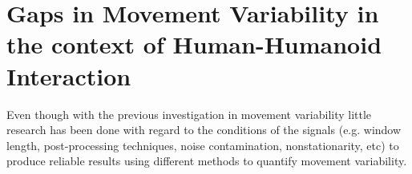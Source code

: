 %
%

\section{Gaps in Movement Variability in the context of Human-Humanoid Interaction}

Even though with the previous investigation in movement variability little research 
has been done with regard to the conditions of the signals (e.g. window length, 
post-processing techniques, noise contamination, nonstationarity, etc) 
to produce reliable results using different methods to quantify movement 
variability.




